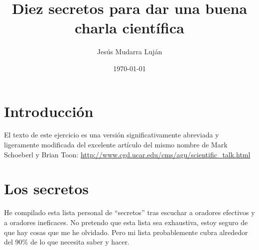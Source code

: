 \documentclass[12pt]{article}
\title{Diez secretos para dar una buena charla científica}
\author{Jesús Mudarra Luján}
\date{\today}
\begin{document}
\maketitle

\section{Introducción}

El texto de este ejercicio es una versión significativamente abreviada y ligeramente modificada del excelente artículo del mismo nombre de Mark Schoeberl y Brian Toon: \url {http://www.cgd.ucar.edu/cms/agu/scientific_talk.html}

\section{Los secretos}

He compilado esta lista personal de ``secretos'' tras escuchar a oradores efectivos y a oradores ineficaces. No pretendo que esta lista sea exhaustiva, estoy seguro de que hay cosas que me he olvidado. Pero mi lista probablemente cubra alrededor del 90\% de lo que necesita saber y hacer.
\end{document}
